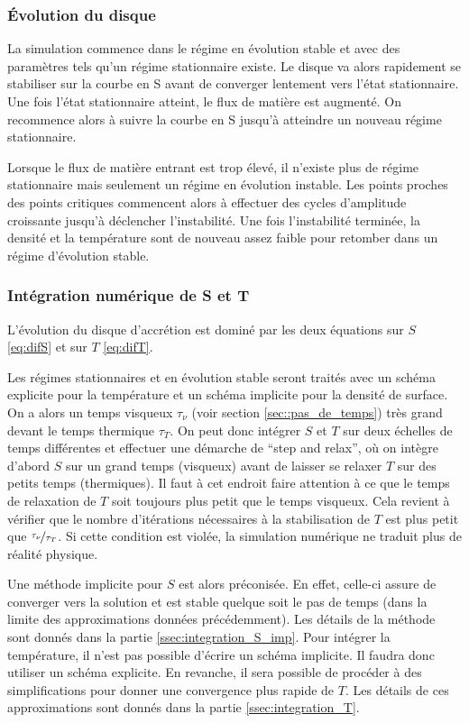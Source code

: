 \subsubsection{Évolution du disque}

La simulation commence dans le régime en évolution stable et avec des paramètres tels qu'un régime stationnaire existe. Le disque va alors rapidement se stabiliser sur la courbe en S avant de converger lentement vers l'état stationnaire. Une fois l'état stationnaire atteint, le flux de matière est augmenté. On recommence alors à suivre la courbe en S jusqu'à atteindre un nouveau régime stationnaire.

Lorsque le flux de matière entrant est trop élevé, il n'existe plus de régime stationnaire mais seulement un régime en évolution instable. Les points proches des points critiques commencent alors à effectuer des cycles d'amplitude croissante jusqu'à déclencher l'instabilité. Une fois l'instabilité terminée, la densité et la température sont de nouveau assez faible pour retomber dans un régime d'évolution stable.

\subsubsection{Intégration numérique de S et T}

L'évolution du disque d'accrétion est dominé par les deux équations sur $S$ \eqref{eq:difS} et sur $T$ \eqref{eq:difT}.

Les régimes stationnaires et en évolution stable seront traités avec un schéma explicite pour la température et un schéma implicite pour la densité de surface. On a alors un temps visqueux $\tau_\nu$  (voir section \ref{sec::pas_de_temps}) très grand devant le temps thermique $\tau_T$. On peut donc intégrer $S$ et $T$ sur deux échelles de temps différentes et effectuer une démarche de ``step and relax'', où on intègre d'abord $S$ sur un grand temps (visqueux) avant de laisser se relaxer $T$ sur des petits temps (thermiques). Il faut à cet endroit faire attention à ce que le temps de relaxation de $T$ soit toujours plus petit que le temps visqueux. Cela revient à vérifier que le nombre d'itérations nécessaires à la stabilisation de $T$ est plus petit que $\nicefrac{\tau_\nu}{\tau_T}$. Si cette condition est violée, la simulation numérique ne traduit plus de réalité physique. 

Une méthode implicite pour $S$ est alors préconisée. En effet, celle-ci assure de converger vers la solution et est stable quelque soit le pas de temps (dans la limite des approximations données précédemment). Les détails de la méthode sont donnés dans la partie \ref{ssec:integration_S_imp}. Pour intégrer la température, il n'est pas possible d'écrire un schéma implicite. Il faudra donc utiliser un schéma explicite. En revanche, il sera possible de procéder à des simplifications pour donner une convergence plus rapide de $T$. Les détails de ces approximations sont donnés dans la partie \ref{ssec:integration_T}.

